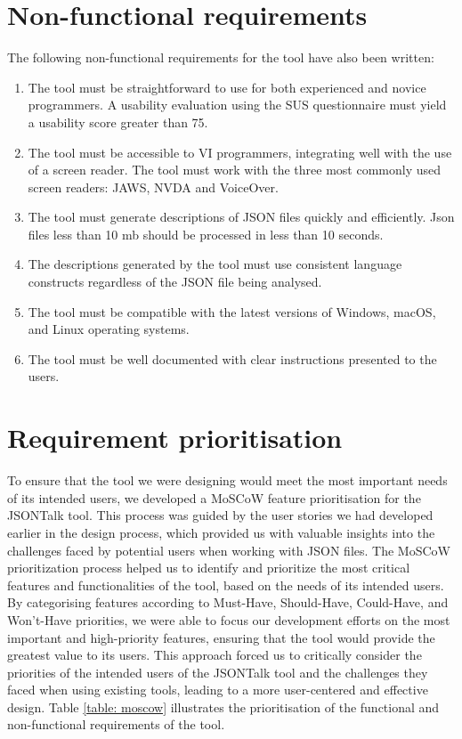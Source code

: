 \documentclass{l4proj}
\begin{document}
\section{Non-functional requirements}

The following non-functional requirements for the tool have also been written:

\begin{small}
\begin{enumerate}
    \item The tool must be straightforward to use for both experienced and novice programmers. A usability evaluation using the SUS \cite{brooke2013sus} questionnaire must yield a usability score greater than 75.
    \item The tool must be accessible to VI programmers, integrating well with the use of a screen reader. The tool must work with the three most commonly used screen readers: JAWS, NVDA and VoiceOver.
    \item The tool must generate descriptions of JSON files quickly and efficiently. Json files less than 10 mb should be processed in less than 10 seconds.
    \item The descriptions generated by the tool must use consistent language constructs regardless of the JSON file being analysed.
    \item The tool must be compatible with the latest versions of Windows, macOS, and Linux operating systems.
    \item The tool must be well documented with clear instructions presented to the users.
\end{enumerate}
\end{small}
\section{Requirement prioritisation}

To ensure that the tool we were designing would meet the most important needs of its intended users, we developed a MoSCoW feature prioritisation for the JSONTalk tool. This process was guided by the user stories we had developed earlier in the design process, which provided us with valuable insights into the challenges faced by potential users when working with JSON files. The MoSCoW prioritization process helped us to identify and prioritize the most critical features and functionalities of the tool, based on the needs of its intended users. By categorising features according to Must-Have, Should-Have, Could-Have, and Won't-Have priorities, we were able to focus our development efforts on the most important and high-priority features, ensuring that the tool would provide the greatest value to its users. This approach forced us to critically consider the priorities of the intended users of the JSONTalk tool and the challenges they faced when using existing tools, leading to a more user-centered and effective design. Table \ref{table: moscow} illustrates the prioritisation of the functional and non-functional requirements of the tool.
\end{document}
